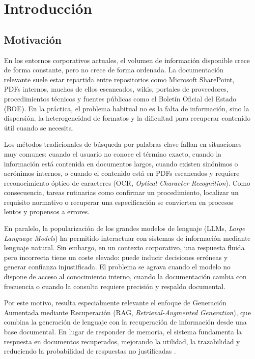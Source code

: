 \chapter{Introducción}
\label{cap:intro}

\section{Motivación}

En los entornos corporativos actuales, el volumen de información disponible crece de forma constante, pero no crece de forma ordenada. La documentación relevante suele estar repartida entre repositorios como Microsoft SharePoint, PDFs internos, muchos de ellos escaneados, wikis, portales de proveedores, procedimientos técnicos y fuentes públicas como el Boletín Oficial del Estado (BOE). En la práctica, el problema habitual no es la falta de información, sino la dispersión, la heterogeneidad de formatos y la dificultad para recuperar contenido útil cuando se necesita.

Los métodos tradicionales de búsqueda por palabras clave fallan en situaciones muy comunes: cuando el usuario no conoce el término exacto, cuando la información está contenida en documentos largos, cuando existen sinónimos o acrónimos internos, o cuando el contenido está en PDFs escaneados y requiere reconocimiento óptico de caracteres (OCR, \textit{Optical Character Recognition}). Como consecuencia, tareas rutinarias como confirmar un procedimiento, localizar un requisito normativo o recuperar una especificación se convierten en procesos lentos y propensos a errores.

En paralelo, la popularización de los grandes modelos de lenguaje (LLMs, \textit{Large Language Models}) ha permitido interactuar con sistemas de información mediante lenguaje natural. Sin embargo, en un contexto corporativo, una respuesta fluida pero incorrecta tiene un coste elevado: puede inducir decisiones erróneas y generar confianza injustificada. El problema se agrava cuando el modelo no dispone de acceso al conocimiento interno, cuando la documentación cambia con frecuencia o cuando la consulta requiere precisión y respaldo documental.

Por este motivo, resulta especialmente relevante el enfoque de Generación Aumentada mediante Recuperación (RAG, \textit{Retrieval-Augmented Generation}), que combina la generación de lenguaje con la recuperación de información desde una base documental. En lugar de responder de memoria, el sistema fundamenta la respuesta en documentos recuperados, mejorando la utilidad, la trazabilidad y reduciendo la probabilidad de respuestas no justificadas \cite{lewis2020rag}.

